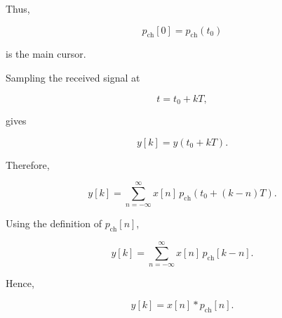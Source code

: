Thus,

\begin{equation}
p_{\mathrm{ch}}[0]
=
p_{\mathrm{ch}}(t_0)
\end{equation}

is the main cursor.

Sampling the received signal at

\begin{equation}
t=t_0+kT,
\end{equation}

gives

\begin{equation}
y[k]
=
y(t_0+kT).
\end{equation}

Therefore,

\begin{equation}
y[k]
=
\sum_{n=-\infty}^{\infty}
x[n]\,
p_{\mathrm{ch}}(t_0+(k-n)T).
\end{equation}

Using the definition of \(p_{\mathrm{ch}}[n]\),

\begin{equation}
y[k]
=
\sum_{n=-\infty}^{\infty}
x[n]\,
p_{\mathrm{ch}}[k-n].
\end{equation}

Hence,

\begin{equation}
y[k]
=
x[n]*p_{\mathrm{ch}}[n].
\end{equation}



